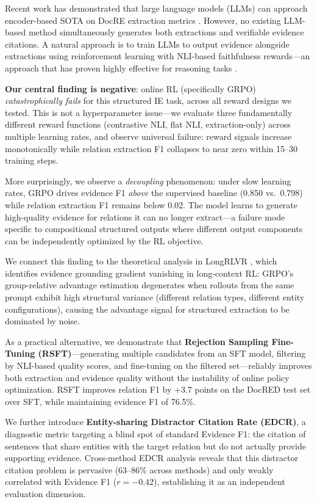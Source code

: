 \documentclass[11pt,a4paper]{article}
\begin{document}
Recent work has demonstrated that large language models (LLMs) can approach encoder-based SOTA on DocRE extraction metrics \citep{wadhwa2023revisiting}.
However, no existing LLM-based method simultaneously generates both extractions and verifiable evidence citations.
A natural approach is to train LLMs to output evidence alongside extractions using reinforcement learning with NLI-based faithfulness rewards---an approach that has proven highly effective for reasoning tasks \citep{deepseek2025r1,shao2024deepseekmath}.

\textbf{Our central finding is negative}: online RL (specifically GRPO) \emph{catastrophically fails} for this structured IE task, across all reward designs we tested.
This is not a hyperparameter issue---we evaluate three fundamentally different reward functions (contrastive NLI, flat NLI, extraction-only) across multiple learning rates, and observe universal failure: reward signals increase monotonically while relation extraction F1 collapses to near zero within 15--30 training steps.

More surprisingly, we observe a \emph{decoupling} phenomenon: under slow learning rates, GRPO drives evidence F1 \emph{above} the supervised baseline (0.850 vs.\ 0.798) while relation extraction F1 remains below 0.02.
The model learns to generate high-quality evidence for relations it can no longer extract---a failure mode specific to compositional structured outputs where different output components can be independently optimized by the RL objective.

We connect this finding to the theoretical analysis in LongRLVR \citep{longrlvr2026}, which identifies evidence grounding gradient vanishing in long-context RL: GRPO's group-relative advantage estimation degenerates when rollouts from the same prompt exhibit high structural variance (different relation types, different entity configurations), causing the advantage signal for structured extraction to be dominated by noise.

As a practical alternative, we demonstrate that \textbf{Rejection Sampling Fine-Tuning (RSFT)}---generating multiple candidates from an SFT model, filtering by NLI-based quality scores, and fine-tuning on the filtered set---reliably improves both extraction and evidence quality without the instability of online policy optimization.
RSFT improves relation F1 by +3.7 points on the DocRED test set over SFT, while maintaining evidence F1 of 76.5\%.

We further introduce \textbf{Entity-sharing Distractor Citation Rate (EDCR)}, a diagnostic metric targeting a blind spot of standard Evidence F1: the citation of sentences that share entities with the target relation but do not actually provide supporting evidence.
Cross-method EDCR analysis reveals that this distractor citation problem is pervasive (63--86\% across methods) and only weakly correlated with Evidence F1 ($r = -0.42$), establishing it as an independent evaluation dimension.
\end{document}
